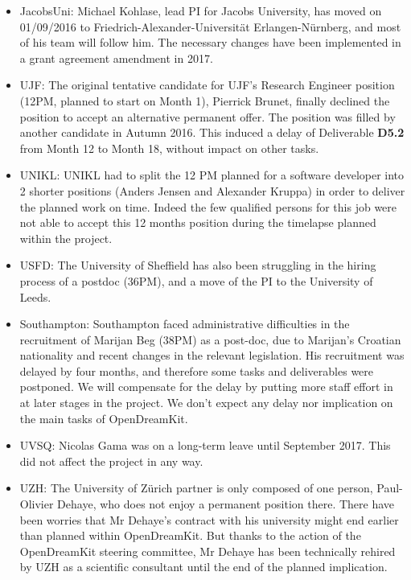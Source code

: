 \begin{itemize}
\item{JacobsUni:} Michael Kohlase, lead PI for Jacobs University, has
  moved on 01/09/2016 to Friedrich-Alexander-Universität
  Erlangen-Nürnberg, and most of his team will follow him. The necessary changes have been
  implemented in a grant agreement amendment in 2017.\\

\item{UJF:} The original tentative candidate for UJF's Research
  Engineer position (12PM, planned to start on Month 1), Pierrick
  Brunet, finally declined the position to accept an alternative
  permanent offer. The position was filled by another candidate in
  Autumn 2016. This induced a delay of Deliverable \textbf{D5.2} from Month 12
  to Month 18, without impact on other tasks.\\

\item{UNIKL:} UNIKL had to split the 12 PM planned for a software developer into 2 shorter positions (Anders Jensen and Alexander Kruppa) in order to deliver the planned work on time. Indeed the few qualified persons for this job were not able to accept this 12 months position during the timelapse planned within the project.\\

\item{USFD:} The University of Sheffield has also been struggling in
  the hiring process of a postdoc (36PM), and a move of the PI to the
  University of Leeds.\\

\item{Southampton:} Southampton faced administrative difficulties in
  the recruitment of Marijan Beg (38PM) as a post-doc, due to
  Marijan's Croatian nationality and recent changes in the relevant
  legislation. His recruitment was delayed by four months, and
  therefore some tasks and deliverables were postponed. We will
  compensate for the delay by putting more staff effort in at later
  stages in the project. We don’t expect any delay nor implication on
  the main tasks of OpenDreamKit.

\item{UVSQ:} Nicolas Gama was on a long-term leave until September
  2017. This did not affect the project in any way.\\

\item{UZH:} The University of Zürich partner is only composed of one
  person, Paul-Olivier Dehaye, who does not enjoy a permanent position
  there. There have been worries that Mr Dehaye's contract with his
  university might end earlier than planned within OpenDreamKit. But
  thanks to the action of the OpenDreamKit steering committee, Mr
  Dehaye has been technically rehired by UZH as a scientific
  consultant until the end of the planned implication.\\


\end{itemize}
